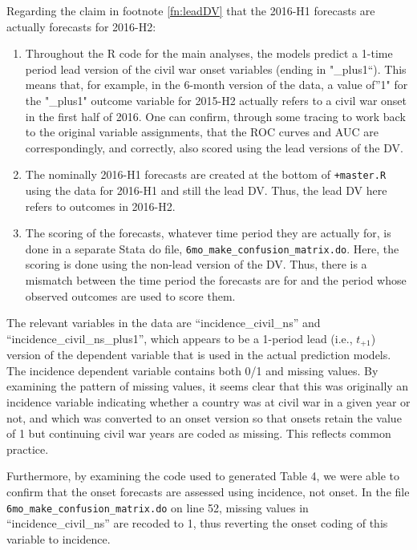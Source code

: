 \documentclass[
]{article}
\providecommand{\tightlist}{%
  \setlength{\itemsep}{0pt}\setlength{\parskip}{0pt}}
\begin{document}
Regarding the claim in footnote \ref{fn:leadDV} that the 2016-H1 forecasts are actually forecasts for 2016-H2:

\begin{enumerate}
\def\labelenumi{\arabic{enumi}.}
\tightlist
\item
  Throughout the R code for the main analyses, the models predict a 1-time period lead version of the civil war onset variables (ending in "\_plus1``). This means that, for example, in the 6-month version of the data, a value of''1" for the "\_plus1" outcome variable for 2015-H2 actually refers to a civil war onset in the first half of 2016. One can confirm, through some tracing to work back to the original variable assignments, that the ROC curves and AUC are correspondingly, and correctly, also scored using the lead versions of the DV.
\item
  The nominally 2016-H1 forecasts are created at the bottom of \texttt{+master.R} using the data for 2016-H1 and still the lead DV. Thus, the lead DV here refers to outcomes in 2016-H2.
\item
  The scoring of the forecasts, whatever time period they are actually for, is done in a separate Stata do file, \texttt{6mo\_make\_confusion\_matrix.do}. Here, the scoring is done using the non-lead version of the DV. Thus, there is a mismatch between the time period the forecasts are for and the period whose observed outcomes are used to score them.
\end{enumerate}

The relevant variables in the data are ``incidence\_civil\_ns'' and ``incidence\_civil\_ns\_plus1'', which appears to be a 1-period lead (i.e., \(t_{+1}\)) version of the dependent variable that is used in the actual prediction models. The incidence dependent variable contains both 0/1 and missing values. By examining the pattern of missing values, it seems clear that this was originally an incidence variable indicating whether a country was at civil war in a given year or not, and which was converted to an onset version so that onsets retain the value of 1 but continuing civil war years are coded as missing. This reflects common practice.

Furthermore, by examining the code used to generated Table 4, we were able to confirm that the onset forecasts are assessed using incidence, not onset. In the file \texttt{6mo\_make\_confusion\_matrix.do} on line 52, missing values in ``incidence\_civil\_ns'' are recoded to 1, thus reverting the onset coding of this variable to incidence.
\end{document}
